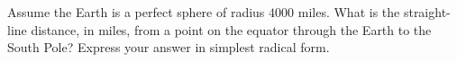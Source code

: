 Assume the Earth is a perfect sphere of radius $4000$ miles. What is the straight-line distance, in miles, from a point on the equator through the Earth to the South Pole? Express your answer in simplest radical form.
